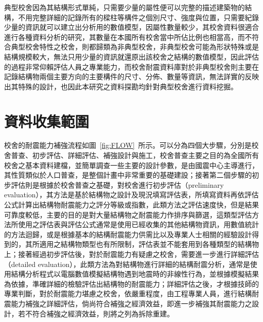典型校舍因為其結構形式單純，只需要少量的屬性便可以完整的描述建築物的結構，不用完整詳細的記錄所有的樑柱等構件之個別尺寸、強度與位置，只需要紀錄少量的資訊就可以建立出分析用的數值模型，因屬性數量較少，其校舍資料很適合進行各種資料分析的研究，其數量在本國所有校舍當中所佔比例也相當高，而不符合典型校舍特性之校舍，則都歸類為非典型校舍，非典型校舍可能為形狀特殊或是結構規模較大，無法只用少量的資訊就還原出該校舍之結構的數值模型，因此評估的過程非常仰賴評估人員之專業能力，而校舍耐震資料庫對於非典型校舍則主要在記錄結構物兩個主要方向的主要構件的尺寸、分佈、數量等資訊，無法詳實的反映出其特殊的設計，也因此本研究之資料探勘均針對典型校舍進行資料挖掘。

\section{資料收集範圍}

校舍的耐震能力補強流程如圖~\ref{fig:FLOW}~所示。可以分為四個大步驟，分別是校舍普查、初步評估、詳細評估、補強設計與施工，校舍普查主要之目的為全國所有校舍之基本資料建檔，並簡單調查一些主要的設計參數，是由國震中心主導進行，其性質類似於人口普查，是整個計畫中非常重要的基礎建設；接著第二個步驟的初步評估則是根據於校舍普查之基礎，對校舍進行初步評估（preliminary evaluation），其方法是基於結構物之設計及現況填寫評估表，所填寫資料再依評估公式計算出結構物耐震能力之評分等級或指數，此類方法之評估速度快，但是結果可靠度較低，主要的目的是對大量結構物之耐震能力作排序與篩選，這類型評估方法所使用之評估表與評估公式通常是使用已經收集的其他結構物資訊，用數值統計的方法迴歸，或是根據基本的結構耐震能力供需比以及專業人士相關的經驗設計得到的，其所適用之結構物類型也有所限制，評估表並不能套用到各種類型的結構物上；接著經過初步評估後，對於耐震能力有疑慮之校舍，需要進一步進行詳細評估（detailed evaluation），此類方法為對結構物進行詳細的結構耐震分析，通常是使用結構分析程式以電腦數值模擬結構物遇到地震時的非線性行為，並根據模擬結果為依據，準確詳細的檢驗評估出結構物的耐震能力；詳細評估之後，才根據技師的專業判斷，對於耐震能力堪慮之校舍，依嚴重程度，由工程專業人員，進行結構耐震能力補強之詳細評估，倘尚符合補強之經濟效益，即進一步補強其耐震能力之設計，若不符合補強之經濟效益，則將之列為拆除重建。


